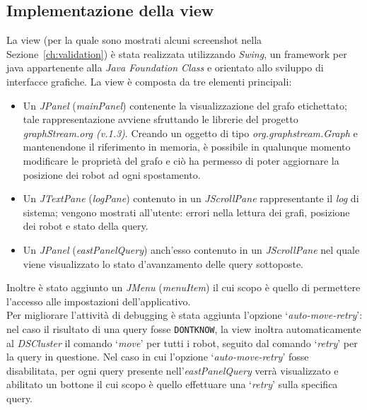 \subsection{Implementazione della view}
\label{sec:viewImpl}
La view (per la quale sono mostrati alcuni screenshot nella Sezione~\ref{ch:validation})
è stata realizzata utilizzando \emph{Swing},
un framework per java appartenente
alla \emph{Java Foundation Class} e orientato allo sviluppo di interfacce grafiche.
La view è composta da tre elementi principali:
\begin{itemize}
	\item Un \emph{JPanel} (\emph{mainPanel}) contenente la visualizzazione
	del grafo etichettato; tale rappresentazione avviene sfruttando le librerie del progetto \emph{graphStream.org (v.1.3)}. Creando un oggetto di tipo \emph{org.graphstream.Graph} e mantenendone il riferimento in memoria, è possibile in qualunque momento modificare le proprietà
	del grafo e ciò ha permesso di poter aggiornare la posizione dei robot ad ogni spostamento.
	\item Un \emph{JTextPane} (\emph{logPane}) contenuto in un \emph{JScrollPane} rappresentante il \emph{log} di sistema; vengono mostrati all'utente: errori nella lettura dei grafi, posizione dei robot e stato della query.
	\item Un \emph{JPanel} (\emph{eastPanelQuery}) anch'esso contenuto in un \emph{JScrollPane} nel quale viene visualizzato lo stato d'avanzamento delle query sottoposte.
\end{itemize}
Inoltre è stato aggiunto un \emph{JMenu} (\emph{menuItem}) il cui scopo è quello di permettere l'accesso alle impostazioni dell'applicativo.\\

Per migliorare l'attività di debugging è stata aggiunta l'opzione `\emph{auto-move-retry}': nel caso il
risultato di una query fosse \texttt{DONTKNOW}, la view inoltra automaticamente al \emph{DSCluster} il comando `\emph{move}' per tutti i robot, seguito dal comando `\emph{retry}'
per la query in questione.
Nel caso in cui l'opzione `\emph{auto-move-retry}' fosse disabilitata, per ogni query presente nell'\emph{eastPanelQuery} verrà visualizzato e abilitato un bottone il cui scopo è quello effettuare
una `\emph{retry}' sulla specifica query.\\

